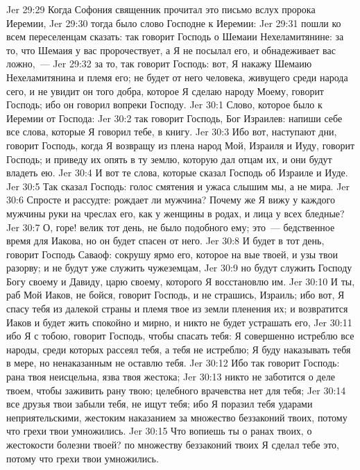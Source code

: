 \vs Jer 29:29 Когда Софония священник прочитал это письмо вслух пророка Иеремии,
\vs Jer 29:30 тогда было слово Господне к Иеремии:
\vs Jer 29:31 пошли ко всем переселенцам сказать: так говорит Господь о Шемаии Нехеламитянине: за то, что Шемаия у вас пророчествует, а Я не посылал его, и обнадеживает вас ложно,~---
\vs Jer 29:32 за то, так говорит Господь: вот, Я накажу Шемаию Нехеламитянина и племя его; не будет от него человека, живущего среди народа сего, и не увидит он того добра, которое Я сделаю народу Моему, говорит Господь; ибо он говорил вопреки Господу.
\vs Jer 30:1 Слово, которое было к Иеремии от Господа:
\vs Jer 30:2 так говорит Господь, Бог Израилев: напиши себе все слова, которые Я говорил тебе, в книгу.
\vs Jer 30:3 Ибо вот, наступают дни, говорит Господь, когда Я возвращу из плена народ Мой, Израиля и Иуду, говорит Господь; и приведу их опять в ту землю, которую дал отцам их, и они будут владеть ею.
\vs Jer 30:4 И вот те слова, которые сказал Господь об Израиле и Иуде.
\vs Jer 30:5 Так сказал Господь: голос смятения и ужаса слышим мы, а не мира.
\vs Jer 30:6 Спросте и рассудте: рождает ли мужчина? Почему же Я вижу у каждого мужчины руки на чреслах его, как у женщины в родах, и лица у всех бледные?
\vs Jer 30:7 О, горе! велик тот день, не было подобного ему; это~--- бедственное время для Иакова, но он будет спасен от него.
\vs Jer 30:8 И будет в тот день, говорит Господь Саваоф: сокрушу ярмо его, которое на вые твоей, и узы твои разорву; и не будут уже служить чужеземцам,
\vs Jer 30:9 но будут служить Господу Богу своему и Давиду, царю своему, которого Я восстановлю им.
\vs Jer 30:10 И ты, раб Мой Иаков, не бойся, говорит Господь, и не страшись, Израиль; ибо вот, Я спасу тебя из далекой страны и племя твое из земли пленения их; и возвратится Иаков и будет жить спокойно и мирно, и никто не будет устрашать его,
\vs Jer 30:11 ибо Я с тобою, говорит Господь, чтобы спасать тебя: Я совершенно истреблю все народы, среди которых рассеял тебя, а тебя не истреблю; Я буду наказывать тебя в мере, но ненаказанным не оставлю тебя.
\vs Jer 30:12 Ибо так говорит Господь: рана твоя неисцельна, язва твоя жестока;
\vs Jer 30:13 никто не заботится о деле твоем, чтобы заживить рану твою; целебного врачевства нет для тебя;
\vs Jer 30:14 все друзья твои забыли тебя, не ищут тебя; ибо Я поразил тебя ударами неприятельскими, жестоким наказанием за множество беззаконий твоих, потому что грехи твои умножились.
\vs Jer 30:15 Что вопиешь ты о ранах твоих, о жестокости болезни твоей? по множеству беззаконий твоих Я сделал тебе это, потому что грехи твои умножились.
